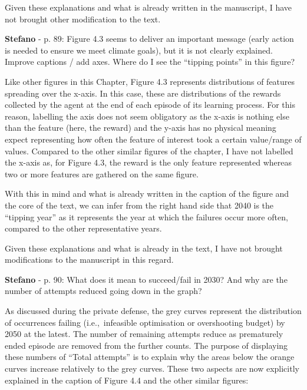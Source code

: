 \documentclass[12pt,a4paper]{article}
\def\ie{i.e.,\ }
\begin{document}
Given these explanations and what is already written in the manuscript, I have not brought other modification to the text.

\begin{mdframed}[style=comment] %
{\color{orange} \textbf{Stefano}} - p. 89: Figure 4.3 seems to deliver an important message (early action is needed to ensure we meet climate goals), but it is not clearly explained. Improve captions / add axes. 	Where do I see the ``tipping points'' in this figure?
\end{mdframed}

\noindent Like other figures in this Chapter, Figure 4.3 represents distributions of features spreading over the x-axis. In this case, these are distributions of the rewards collected by the agent at the end of each episode of its learning process. For this reason, labelling the axis does not seem obligatory as the x-axis is nothing else than the feature (here, the reward) and the y-axis has no physical meaning expect representing how often the feature of interest took a certain value/range of values. Compared to the other similar figures of the chapter, I have not labelled the x-axis as, for Figure 4.3, the reward is the only feature represented whereas two or more features are gathered on the same figure.

With this in mind and what is already written in the caption of the figure and the core of the text, we can infer from the right hand side that 2040 is the ``tipping year'' as it represents the year at which the failures occur more often, compared to the other representative years. 

Given these explanations and what is already in the text, I have not brought modifications to the manuscript in this regard.

\begin{mdframed}[style=comment] %
{\color{orange} \textbf{Stefano}} - p. 90: What does it mean to succeed/fail in 2030? And why are the number of attempts reduced going down in the graph?
\end{mdframed}

\noindent As discussed during the private defense, the grey curves represent the distribution of occurrences failing (\ie infeasible optimisation or overshooting  budget) by 2050 at the latest. The number of remaining attempts reduce as prematurely ended episode are removed from the further counts. The purpose of displaying these numbers of ``Total attempts'' is to explain why the areas below the orange curves increase relatively to the grey curves. These two aspects are now explicitly explained {\color{blue}in the caption of Figure 4.4 and the other similar figures}:
\end{document}
